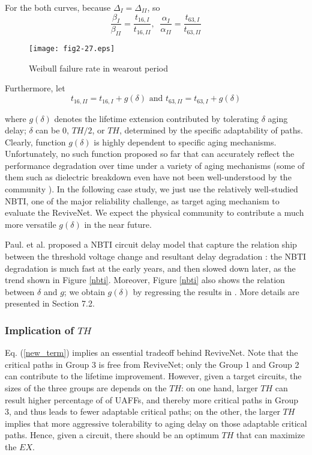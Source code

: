 For the both curves, because $\Delta_I=\Delta_{II}$, so
\begin{equation}\label{frac}
\frac{\beta_I}{\beta_{II}}=
\frac{t_{16,I}}{t_{16,II}},\;\;\frac{\alpha_I}{\alpha_{II}}=\frac{t_{63,I}}{t_{63,II}}
\end{equation}


\begin{figure}[t]
\centering
\texttt{[image: fig2-27.eps]}%
\vspace{-0.2cm}
   \caption{Weibull failure rate in wearout period}\label{weibull}
\end{figure}

Furthermore, let
\begin{equation}\label{newab}
t_{16,II}=t_{16,I}+g(\delta) \mbox{ and }  t_{63,II}=t_{63,I}+g(\delta)
\end{equation}

where $g(\delta)$ denotes the lifetime extension contributed by tolerating $\delta$ aging delay; $\delta$ can be $0$, $TH/2$, or $TH$, determined by the specific adaptability of paths. Clearly, function $g(\delta)$ is highly dependent to specific aging mechanisms. Unfortunately, no such function proposed so far that can accurately reflect the performance degradation over time under a variety of aging mechanisms (some of them such as dielectric breakdown even have not been well-understood by the community \cite{Reliability_limits_IBM02}). In the following case study, we just use the relatively well-studied NBTI, one of the major reliability challenge, as target aging mechanism to evaluate the ReviveNet. We expect the physical community to contribute a much more versatile $g(\delta)$ in the near future.

Paul. et al. proposed a NBTI circuit delay model that capture the relation ship between the threshold voltage change and resultant delay degradation \cite{NBTI_Impact05}: the NBTI degradation is much fast at the early years, and then slowed down later, as the trend shown in Figure \ref{nbti}. Moreover, Figure \ref{nbti} also shows the relation between $\delta$ and $g$; we obtain $g(\delta)$ by regressing the results in \cite{Impact-of-NBTI_07}. More details are presented in Section 7.2.


\subsubsection{Implication of $TH$}
Eq. (\ref{new_term}) implies an essential tradeoff behind ReviveNet. Note that the critical paths in Group 3 is free from ReviveNet; only the Group 1 and Group 2 can contribute to the lifetime improvement. However, given a target circuits, the sizes of the three groups are depends on the $TH$: on one hand, larger $TH$ can result higher percentage of of UAFFs, and thereby more critical paths in Group 3, and thus leads to fewer adaptable critical paths; on the other, the larger $TH$ implies that more aggressive tolerability to aging delay on those adaptable critical paths. Hence, given a circuit, there should be an optimum $TH$ that can maximize the $EX$.


